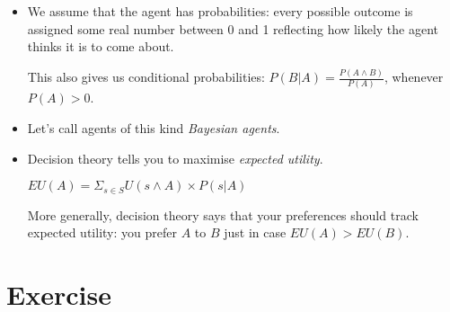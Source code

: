 \documentclass[justified]{tufte-handout}
\begin{document}
\begin{itemize}
\item We assume that the agent has probabilities: every possible outcome is assigned some real number between 0 and 1 reflecting how likely the agent thinks it is to come about. 

\vspace{.2cm}

\noindent This also gives us conditional probabilities: $P(B|A) = \frac{P(A\wedge B)}{P(A)}$, whenever $P(A) >0$.


\item Let's call agents of this kind \emph{Bayesian agents}.


\item Decision theory tells you to maximise \emph{expected utility}.


\vspace{.2cm}

\noindent $EU(A) = \Sigma_{s\in S} U(s \wedge A) \times P(s|A)$


\vspace{.2cm}

\noindent More generally, decision theory says that your preferences should track expected utility: you prefer $A$ to $B$ just in case $EU(A)>EU(B)$.


\end{itemize}


\section{Exercise}
\end{document}
